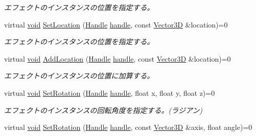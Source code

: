 \begin{DoxyCompactItemize}
\begin{DoxyCompactList}\small\item\em エフェクトのインスタンスの位置を指定する。 \end{DoxyCompactList}\item 
virtual \mbox{\hyperlink{namespace_effekseer_ab34c4088e512200cf4c2716f168deb56}{void}} \mbox{\hyperlink{class_effekseer_1_1_manager_a352b7682da97c9811e3b91350cf8cae9}{Set\+Location}} (\mbox{\hyperlink{namespace_effekseer_afba58b8d812da862190e9bbfc040824a}{Handle}} \mbox{\hyperlink{namespace_effekseer_afd99b336b206999bdcca3e431648efbc}{handle}}, const \mbox{\hyperlink{struct_effekseer_1_1_vector3_d}{Vector3D}} \&location)=0
\begin{DoxyCompactList}\small\item\em エフェクトのインスタンスの位置を指定する。 \end{DoxyCompactList}\item 
virtual \mbox{\hyperlink{namespace_effekseer_ab34c4088e512200cf4c2716f168deb56}{void}} \mbox{\hyperlink{class_effekseer_1_1_manager_a8f391814f681fc7acc4e8ed785c80cbc}{Add\+Location}} (\mbox{\hyperlink{namespace_effekseer_afba58b8d812da862190e9bbfc040824a}{Handle}} \mbox{\hyperlink{namespace_effekseer_afd99b336b206999bdcca3e431648efbc}{handle}}, const \mbox{\hyperlink{struct_effekseer_1_1_vector3_d}{Vector3D}} \&location)=0
\begin{DoxyCompactList}\small\item\em エフェクトのインスタンスの位置に加算する。 \end{DoxyCompactList}\item 
virtual \mbox{\hyperlink{namespace_effekseer_ab34c4088e512200cf4c2716f168deb56}{void}} \mbox{\hyperlink{class_effekseer_1_1_manager_aab0df458615143d664e8f84d176a5be6}{Set\+Rotation}} (\mbox{\hyperlink{namespace_effekseer_afba58b8d812da862190e9bbfc040824a}{Handle}} \mbox{\hyperlink{namespace_effekseer_afd99b336b206999bdcca3e431648efbc}{handle}}, float x, float y, float z)=0
\begin{DoxyCompactList}\small\item\em エフェクトのインスタンスの回転角度を指定する。(ラジアン) \end{DoxyCompactList}\item 
virtual \mbox{\hyperlink{namespace_effekseer_ab34c4088e512200cf4c2716f168deb56}{void}} \mbox{\hyperlink{class_effekseer_1_1_manager_ab47844dad076bb833b0176e877736cfa}{Set\+Rotation}} (\mbox{\hyperlink{namespace_effekseer_afba58b8d812da862190e9bbfc040824a}{Handle}} \mbox{\hyperlink{namespace_effekseer_afd99b336b206999bdcca3e431648efbc}{handle}}, const \mbox{\hyperlink{struct_effekseer_1_1_vector3_d}{Vector3D}} \&axis, float angle)=0

\end{DoxyCompactItemize}
